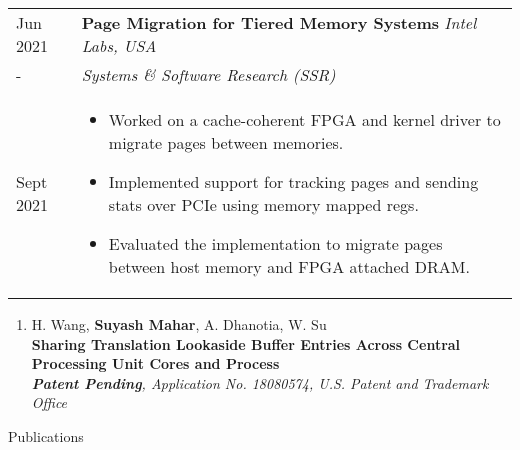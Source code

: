 \documentclass{article}
\newlength{\workexitemsep}
\newlength{\sectionbottommargin}
\newlength{\durlen}
\newlength{\deslen}
\newenvironment{nothing}{}
\newcommand{\sectiontitle}[1]{
  \textbf{\Large{\sffamily #1}}
  \begin{flushright}
      \vspace{-0.48cm} 
      \rule{0.975\textwidth}{1.1pt}
  \end{flushright}
  \vspace{-0.1cm} 
}
\begin{document}
\begin{tabular}{p{\durlen} p{\deslen}}
  \centering Jun 2021       & \textbf{Page Migration for Tiered Memory Systems} \hfill \textit{Intel Labs, USA} \\
  \centering -              & \textit{Systems \& Software Research (SSR)} \\ 
  \centering Sept 2021      & \vspace{-0.6cm}\begin{itemize}[itemsep=\workexitemsep] 
          \item Worked on a cache-coherent FPGA and kernel driver to migrate pages between memories.
          \item Implemented support for tracking pages and sending stats over PCIe using memory mapped regs.
          \item Evaluated the implementation to migrate pages between host memory and FPGA attached DRAM.
  \end{itemize}
\end{tabular}

\vspace{-0.2cm}


\vspace{-3mm}

\begin{nothing}
    \vspace{\sectionbottommargin} 
    
    \ifdefined\resume
        \vspace{-0.2cm} 
    \fi 

    \begin{enumerate}
            \item H. Wang, \textbf{Suyash Mahar}, A. Dhanotia, W. Su\\
        \textbf{Sharing Translation Lookaside Buffer Entries Across Central Processing Unit 
          Cores and Process} \\
        {\it\footnotesize \textbf{Patent Pending}, Application No. 18080574, U.S. Patent and Trademark Office}
        
    \end{enumerate}
\end{nothing}


\sectiontitle{Publications} 
\end{document}
